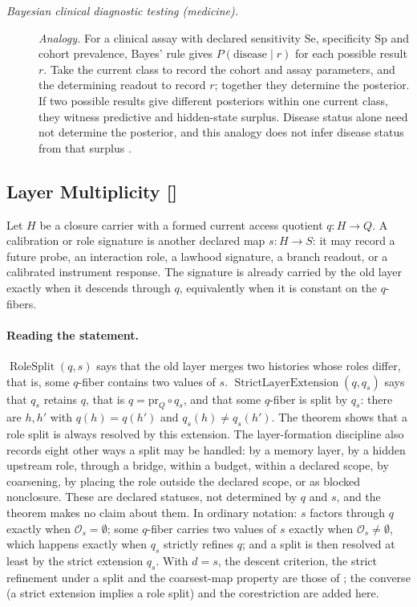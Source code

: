\begingroup\small
\begin{description}
\item[\emph{Bayesian clinical diagnostic testing (medicine).}] \textit{Analogy.}
For a clinical assay with declared sensitivity \(\mathrm{Se}\),
specificity \(\mathrm{Sp}\) and cohort prevalence, Bayes' rule gives
\(P(\text{disease}\mid r)\) for each possible result \(r\). Take the current
class to record the cohort and assay parameters, and the determining readout
to record \(r\); together they determine the posterior. If two possible
results give different posteriors within one current class, they witness
predictive and hidden-state surplus. Disease status alone need not determine
the posterior, and this analogy does not infer disease status from that
surplus \citep{Sackett2000EvidenceBasedMedicine}.

\end{description}
\endgroup


\subsection{Layer Multiplicity [\texorpdfstring{}{F24}]}\label{sec:access:layer-multiplicity}

Let \(H\) be a closure carrier with a formed current access quotient
\(q:H\to Q\).  A calibration or role signature is another declared
map \(s:H\to S\): it may record a future probe, an interaction role,
a lawhood signature, a branch readout, or a calibrated instrument
response.  The signature is already carried by the old layer exactly
when it descends through \(q\), equivalently when it is constant on
the \(q\)-fibers.

\paragraph{Reading the statement.}
\(\operatorname{RoleSplit}(q,s)\) says that the old layer merges two
histories whose roles differ, that is, some \(q\)-fiber contains two
values of \(s\). \(\operatorname{StrictLayerExtension}(q,q_s)\) says
that \(q_s\) retains \(q\), that is \(q=\mathrm{pr}_Q\circ q_s\), and that some
\(q\)-fiber is split by \(q_s\): there are \(h,h'\) with \(q(h)=q(h')\) and
\(q_s(h)\ne q_s(h')\). The theorem shows that a role split
is always resolved by this extension. The layer-formation discipline also
records eight other ways a split may be handled: by a memory layer, by a
hidden upstream role, through a bridge, within a budget, within a declared
scope, by coarsening, by placing the role outside the declared scope, or as
blocked nonclosure. These are declared statuses, not determined by \(q\) and
\(s\), and the theorem makes no claim about them. In ordinary notation: \(s\) factors
through \(q\) exactly when \(\mathcal O_s=\emptyset\); some \(q\)-fiber
carries two values of \(s\) exactly when \(\mathcal O_s\neq\emptyset\),
which happens exactly when \(q_s\) strictly refines \(q\); and a split
is then resolved at least by the strict extension \(q_s\). With \(d=s\), the
descent criterion, the strict refinement under a split and the coarsest-map
property are those of ; the converse (a strict extension
implies a role split) and the corestriction are added here.


